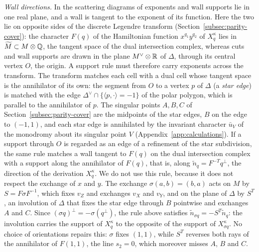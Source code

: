 \emph{Wall directions.}  In the scattering diagrams of
\cite{grosspandharipandesiebert2010,grossetal2016theta} exponents and wall
supports lie in one real plane, and a wall is tangent to the exponent of its
function.  Here the two lie on opposite sides of the discrete Legendre
transform (Section~\ref{subsec:parity-cover}): the character $F(q)$ of the
Hamiltonian function $x^{q_1}y^{q_2}$ of $X^\kappa_q$ lies in
$\widetilde M\subset M\otimes\mathbb Q$, the tangent space of the dual
intersection complex, whereas cuts
and wall supports are drawn in the plane $M^\vee\otimes\mathbb R$ of $\Delta$,
through its central vertex $O$, the origin.  A support rule must therefore
carry exponents across the transform.  The transform matches each cell with a
dual cell whose tangent space is the annihilator of its own: the segment from
$O$ to a vertex $p$ of $\Delta$ (a \emph{star edge}) is matched with the edge
$\Delta^\vee\cap\{\langle p,\cdot\rangle=-1\}$ of the polar polygon, which
is parallel to the annihilator of $p$.  The singular points $A,B,C$ of
Section~\ref{subsec:parity-cover} are the midpoints of the star edges, $B$ on
the edge to $(-1,1)$, and each star edge is annihilated by the invariant
character $\bar u_V$ of the monodromy about its singular point $V$
(Appendix~\ref{app:calculations}).  If a support through $O$ is regarded as
an edge of a refinement of the star subdivision, the same rule matches a wall
tangent to $F(q)$ on the dual intersection complex with a support along the
annihilator of $F(q)$, that is, along $\widetilde n_q=F^{-T}q^\perp$, the
direction of the derivation $X^\kappa_q$.  We do not use this rule, because it does not
respect the exchange of $x$ and $y$.  The exchange $\sigma(a,b)=(b,a)$ acts
on $M$ by $S=F\sigma F^{-1}$, which fixes $v_Z$ and exchanges $v_X$ and $v_Y$,
and on the plane of $\Delta$ by $S^T$, an involution of $\Delta$ that fixes
the star edge through $B$ pointwise and exchanges $A$ and $C$.  Since
$(\sigma q)^\perp=-\sigma(q^\perp)$, the rule above satisfies
$\widetilde n_{\sigma q}=-S^T\widetilde n_q$: the involution carries the
support of $X^\kappa_q$ to the opposite of the support of $X^\kappa_{\sigma q}$.
No choice of orientations repairs this: $\sigma$ fixes $(1,1)$, while $S^T$
reverses both rays of the annihilator of $F(1,1)$, the line $s_2=0$, which
moreover misses $A$, $B$ and $C$.

